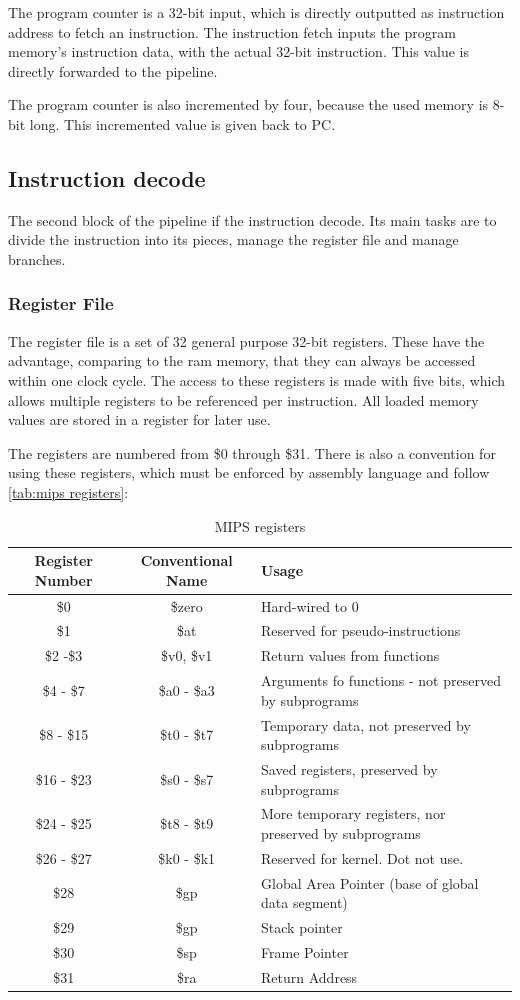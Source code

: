 The program counter is a 32-bit input, which is directly outputted as instruction address to fetch an instruction. The instruction fetch inputs the program memory's instruction data, 
with the actual 32-bit instruction. This value is directly forwarded to the pipeline.

The program counter is also incremented by four, because the used memory is 8-bit long. This incremented value is given back to PC.
\subsection{Instruction decode}
The second block of the pipeline if the instruction decode. Its main tasks are to divide the instruction into its pieces, manage the register file and manage branches.

\subsubsection{Register File}
The register file is a set of 32 general purpose 32-bit registers. These have the advantage, comparing to the ram memory, that they can always be accessed within one clock cycle.
The access to these registers is made with five bits, which allows multiple registers to be referenced per instruction. All loaded memory values are stored in a register
for later use.

The registers are numbered from \$0 through \$31. There is also a convention for using these registers, which must be enforced by assembly language and follow \autoref{tab:mips registers}:

\begin{table}[h!]
	\centering
	 \caption{MIPS registers}	
	\begin{tabular}{ccl}
		\toprule[2pt]
		\textbf{Register Number} & \textbf{Conventional Name} &\textbf{Usage}  \\
		\toprule[2pt]
		\$0 & \$zero & Hard-wired to 0 \\
		\$1 & \$at & Reserved for pseudo-instructions \\
		\$2 -\$3 & \$v0, \$v1 & Return values from functions \\
		\$4 - \$7 & \$a0 - \$a3 & Arguments fo functions - not preserved by subprograms \\
		\$8 - \$15 & \$t0 - \$t7 & Temporary data, not preserved by subprograms \\
		\$16 - \$23 & \$s0 - \$s7 & Saved registers, preserved by subprograms \\
		\$24 - \$25 & \$t8 - \$t9 & More temporary registers, nor preserved by subprograms  \\
		\$26 - \$27 & \$k0 - \$k1  & Reserved for kernel. Dot not use. \\
		\$28 & \$gp & Global Area Pointer (base of global data segment) \\
		\$29 & \$gp & Stack pointer \\
		\$30 & \$sp & Frame Pointer \\
		\$31 & \$ra & Return Address \\
		\bottomrule[2pt]
	\end{tabular} 
	\label{tab:iu_Kennlinie}
\end{table}

